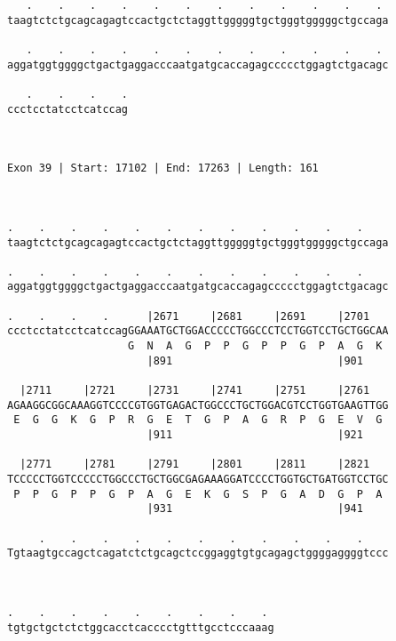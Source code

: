 \documentclass{article}
\begin{document}
\begin{Verbatim}
   .    .    .    .    .    .    .    .    .    .    .    . 
taagtctctgcagcagagtccactgctctaggttgggggtgctgggtgggggctgccaga
                                                            
   .    .    .    .    .    .    .    .    .    .    .    . 
aggatggtggggctgactgaggacccaatgatgcaccagagccccctggagtctgacagc
                                                            
   .    .    .    .
ccctcctatcctcatccag
                   
                   
 
Exon 39 | Start: 17102 | End: 17263 | Length: 161



.    .    .    .    .    .    .    .    .    .    .    .    
taagtctctgcagcagagtccactgctctaggttgggggtgctgggtgggggctgccaga
                                                            
.    .    .    .    .    .    .    .    .    .    .    .    
aggatggtggggctgactgaggacccaatgatgcaccagagccccctggagtctgacagc
                                                            
.    .    .    .      |2671     |2681     |2691     |2701   
ccctcctatcctcatccagGGAAATGCTGGACCCCCTGGCCCTCCTGGTCCTGCTGGCAA
                   G  N  A  G  P  P  G  P  P  G  P  A  G  K 
                      |891                          |901    
  
  |2711     |2721     |2731     |2741     |2751     |2761   
AGAAGGCGGCAAAGGTCCCCGTGGTGAGACTGGCCCTGCTGGACGTCCTGGTGAAGTTGG
 E  G  G  K  G  P  R  G  E  T  G  P  A  G  R  P  G  E  V  G 
                      |911                          |921    
  
  |2771     |2781     |2791     |2801     |2811     |2821   
TCCCCCTGGTCCCCCTGGCCCTGCTGGCGAGAAAGGATCCCCTGGTGCTGATGGTCCTGC
 P  P  G  P  P  G  P  A  G  E  K  G  S  P  G  A  D  G  P  A 
                      |931                          |941    
  
     .    .    .    .    .    .    .    .    .    .    .    
Tgtaagtgccagctcagatctctgcagctccggaggtgtgcagagctggggaggggtccc
                                                            
                                                            
  
.    .    .    .    .    .    .    .    . 
tgtgctgctctctggcacctcacccctgtttgcctcccaaag
                                          
                                          
 

\end{Verbatim}
\end{document}
